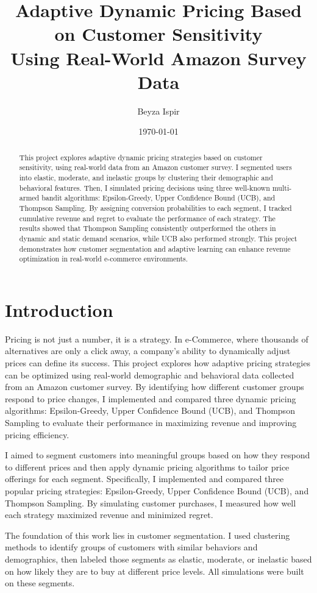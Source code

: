\documentclass[12pt]{article}
\title{Adaptive Dynamic Pricing Based on Customer Sensitivity\\ \large Using Real-World Amazon Survey Data}
\author{Beyza Ispir}
\date{\today}
\begin{document}
\maketitle

\begin{abstract}
This project explores adaptive dynamic pricing strategies based on customer sensitivity, using real-world data from an Amazon customer survey. I segmented users into elastic, moderate, and inelastic groups by clustering their demographic and behavioral features. Then, I simulated pricing decisions using three well-known multi-armed bandit algorithms: Epsilon-Greedy, Upper Confidence Bound (UCB), and Thompson Sampling. By assigning conversion probabilities to each segment, I tracked cumulative revenue and regret to evaluate the performance of each strategy. The results showed that Thompson Sampling consistently outperformed the others in dynamic and static demand scenarios, while UCB also performed strongly. This project demonstrates how customer segmentation and adaptive learning can enhance revenue optimization in real-world e-commerce environments.
\end{abstract}
\newpage

\section{Introduction}
Pricing is not just a number, it is a strategy. In e-Commerce, where thousands of alternatives are only a click away, a company's ability to dynamically adjust prices can define its success. This project explores how adaptive pricing strategies can be optimized using real-world demographic and behavioral data collected from an Amazon customer survey. By identifying how different customer groups respond to price changes, I implemented and compared three dynamic pricing algorithms: Epsilon-Greedy, Upper Confidence Bound (UCB), and Thompson Sampling to evaluate their performance in maximizing revenue and improving pricing efficiency.

I aimed to segment customers into meaningful groups based on how they respond to different prices and then apply dynamic pricing algorithms to tailor price offerings for each segment. Specifically, I implemented and compared three popular pricing strategies: Epsilon-Greedy, Upper Confidence Bound (UCB), and Thompson Sampling. By simulating customer purchases, I measured how well each strategy maximized revenue and minimized regret.

The foundation of this work lies in customer segmentation. I used clustering methods to identify groups of customers with similar behaviors and demographics, then labeled those segments as elastic, moderate, or inelastic based on how likely they are to buy at different price levels. All simulations were built on these segments.
\end{document}
